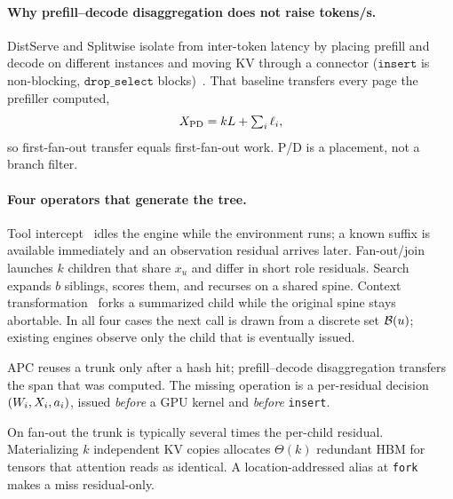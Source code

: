\paragraph{Why prefill--decode disaggregation does not raise tokens/s.}
DistServe and Splitwise isolate \ttft{} from inter-token latency by placing prefill and decode on different instances and moving KV through a connector ($\texttt{insert}$ is non-blocking, $\texttt{drop\_select}$ blocks)~\cite{distserve,splitwise}.
That baseline transfers every page the prefiller computed,
\begin{equation}
\label{eq:xfer-stock}
X_{\mathrm{PD}}=kL+\textstyle\sum_i\ell_i,
\end{equation}
so first-fan-out transfer equals first-fan-out work.
P/D is a placement, not a branch filter.

\paragraph{Four operators that generate the tree.}
Tool intercept~\cite{react,toolformer} idles the engine while the environment runs; a known suffix is available immediately and an observation residual arrives later.
Fan-out/join~\cite{autogen,metagpt} launches $k$ children that share $x_u$ and differ in short role residuals.
Search~\cite{tot,hive} expands $b$ siblings, scores them, and recurses on a shared spine.
Context transformation~\cite{smoothagent} forks a summarized child while the original spine stays abortable.
In all four cases the next call is drawn from a discrete set $\mathcal{B}(u)$; existing engines observe only the child that is eventually issued.

\begin{insight}
\label{ins:prune}
APC reuses a trunk only after a hash hit; prefill--decode disaggregation transfers the span that was computed.
The missing operation is a per-residual decision $(W_i,X_i,a_i)$, issued \emph{before} a GPU kernel and \emph{before} \texttt{insert}.
\end{insight}

\begin{insight}
\label{ins:fork}
On fan-out the trunk is typically several times the per-child residual.
Materializing $k$ independent KV copies allocates $\Theta(k)$ redundant HBM for tensors that attention reads as identical.
A location-addressed alias at \texttt{fork} makes a miss residual-only.
\end{insight}

